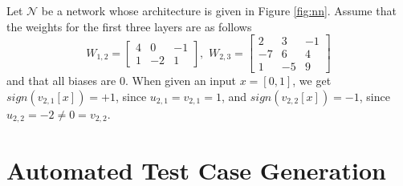 \documentclass[runningheads,a4paper]{llncs}
\newcommand{\xiaowei}[1]{{\color{blue}#1}}
\newcommand{\youcheng}[1]{{\color{red}#1}}
\newcommand{\networks}{\mathcal{N}}
\begin{document}
\begin{example}\label{example:weights}
Let $\networks$ be a network whose architecture is given in Figure \ref{fig:nn}.  
Assume that the weights for the first three layers are as follows
\[
W_{1,2}=
\begin{bmatrix}
  4 & 0 & -1\\
  1 & -2 & 1
\end{bmatrix},\,\,
W_{2,3}=
\begin{bmatrix}
  2 & 3 & -1\\
  -7 & 6 & 4 \\
  1 & -5 & 9
\end{bmatrix}
\]
and that all biases are 0. When given an input 
$x=[0, 1]$, we get $\mathit{sign}(v_{2,1}[x])=+1$, since
$u_{2,1}=v_{2,1}=1$, and $\mathit{sign}(v_{2,2}[x])=-1$,
since $u_{2,2} = -2 \neq 0 = v_{2,2}$. 
\end{example}%

\section{Automated Test Case Generation}\label{sec:test-gen}\newcommand{\constraints}{\mathcal{C}}
\end{document}
